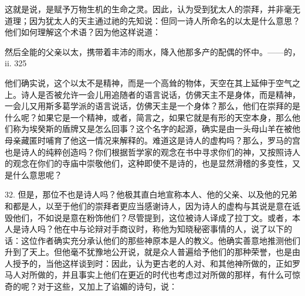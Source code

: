 这就是说，是赋予万物生机的生命之灵。因此，认为受到犹太人的崇拜，并非毫无道理；因为犹太人的天主通过祂的先知说：但同一诗人所命名的以太是什么意思？他们如何理解这个术语？因为他这样说道：\par

然后全能的父亲以太，携带着丰沛的雨水，\newline{}降入他那多产的配偶的怀中。\newline{}——的，ii. 325\par

他们确实说，这个以太不是精神，而是一个高耸的物体，天空在其上延伸于空气之上。诗人是否被允许一会儿用追随者的语言说话，仿佛天主不是身体，而是精神，一会儿又用斯多葛学派的语言说话，仿佛天主是一个身体？那么，他们在崇拜的是什么呢？如果它是一个精神，或者，简言之，如果它就是有形的天空本身，那么他们称为埃癸斯的盾牌又是怎么回事？这个名字的起源，确实是由一头母山羊在被他母亲藏匿时哺育了他这一情况来解释的。难道这是诗人的虚构吗？那么，罗马的宫也是诗人的纯粹创造吗？你们根据哲学家的观念在书中寻求你们的神，又按照诗人的观念在你们的寺庙中崇敬他们，这种即使不是诗的，也是显然滑稽的多变性，又是什么意思呢？\par

32. 但是，那位不也是诗人吗？他极其直白地宣称本人、他的父亲、以及他的兄弟和都是人，以至于他们的崇拜者更应当感谢诗人，因为诗人的虚构与其说是意在诋毁他们，不如说是意在粉饰他们？尽管提到，这位被诗人译成了拉丁文。或者，本人是诗人吗？他在中与论辩对手商议时，称他为知晓秘密事情的人，说了以下的话：这位作者确实充分承认他们的那些神原本是人的教义。他确实善意地推测他们升到了天上。但他毫不犹豫地公开说，就是众人普遍给予他们的那种荣誉，也是由人授予的，当他这样谈到时：因此，认为更古老的人对、和其他神所做的，正如罗马人对所做的，并且事实上他们在更近的时代也考虑过对所做的那样，有什么可惊奇的呢？对于这些，又加上了谄媚的诗句，说：\par

